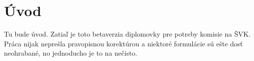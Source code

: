 \chapter*{Úvod}

Tu bude úvod. Zatiaľ je toto betaverzia diplomovky pre potreby komisie na ŠVK. Práca nijak neprešla pravopisnou korektúrou a niektoré formulácie sú ešte dosť neohrabané, no jednoducho je to na nečisto.
